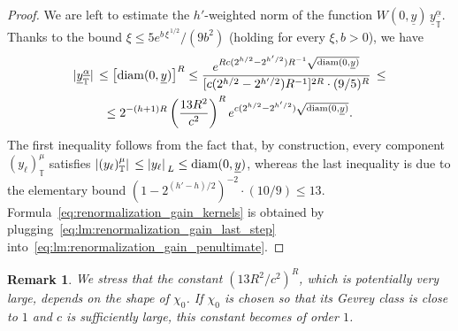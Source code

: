 \documentclass[a4paper, 11pt]{article}
\newcommand{\torus}{{\scriptstyle{\mathbb{T}}}}				%
\theoremstyle{thm}
\newtheorem{rmk}{Remark}
\begin{document}
\begin{proof}
We are left to estimate the $h'$-weighted norm of the function $W(0, \underline{y}) \, \underline{y}^{\underline{\alpha}}_\torus$. Thanks to the bound $\xi \le 5e^{b \, \xi^{ \, 1/2}}/(9b^2)$ (holding for every $\xi, b > 0$), we have
\begin{multline}
\label{eq:lm:renormalization_gain_last_step}
\abs*{\underline{y}^{\underline{\alpha}}_\torus} \le \left[ \mathrm{diam}(0, \underline{y}) \right]^R \le \frac{e^{Rc(2^{h/2} - 2^{h'/2}) R^{-1} \sqrt{\mathrm{diam}(0, \underline{y})}}}{[c(2^{h/2} - 2^{h'/2})R^{-1}]^{2R} \cdot (9/5)^R} \, \le \\
\le 2^{-(h+1)R} \left(\frac{13R^2}{c^2} \right)^R e^{c(2^{h/2} - 2^{h'/2}) \sqrt{\mathrm{diam}(0, \underline{y})}}.
\end{multline}
The first inequality follows from the fact that, by construction, every component $(y_\ell)_\torus^\mu$ satisfies $\abs*{(y_\ell)_\torus^\mu} \le \abs*{y_\ell}_L \le \mathrm{diam}(0, \underline{y})$, whereas the last inequality is due to the elementary bound $(1 - 2^{(h' - h)/2})^{-2} \cdot (10/9) \le 13$. Formula~\eqref{eq:renormalization_gain_kernels} is obtained by plugging~\eqref{eq:lm:renormalization_gain_last_step} into~\eqref{eq:lm:renormalization_gain_penultimate}.
\end{proof}
\begin{rmk}
\label{rmk:constant}
We stress that the constant $(13R^2/c^2)^R$, which is potentially very large, depends on the shape of $\chi_0$. If $\chi_0$ is chosen so that its Gevrey class is close to $1$ and $c$ is sufficiently large, this constant becomes of order $1$. 
\end{rmk}
\end{document}
